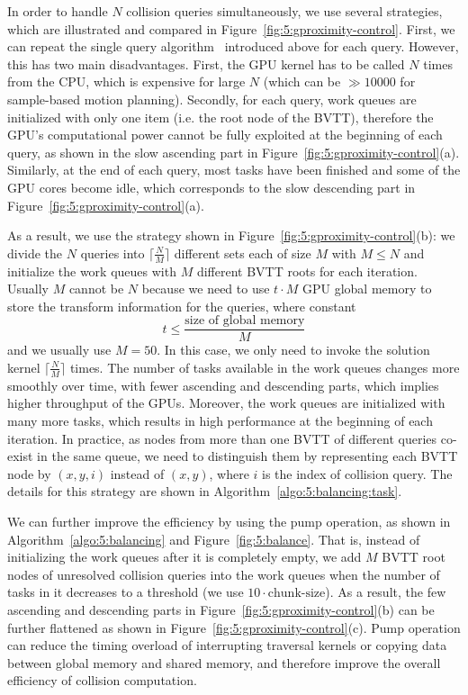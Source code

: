In order to handle $N$ collision queries simultaneously, we use several strategies, which are illustrated and compared in Figure~\ref{fig:5:gproximity-control}. First, we can repeat the single query algorithm~\cite{Lauterbach10} introduced above for each query. However, this has two main disadvantages. First, the GPU kernel has to be called $N$ times from the CPU, which is expensive for large $N$ (which can be $\gg 10000$ for sample-based motion planning). Secondly, for each query, work queues are initialized with only one item (i.e. the root node of the BVTT), therefore the GPU's computational power cannot be fully exploited at the beginning of each query, as shown in the slow ascending part in Figure~\ref{fig:5:gproximity-control}(a). Similarly, at the end of each query, most tasks have been finished and some of the GPU cores become idle, which corresponds to the slow descending part in Figure~\ref{fig:5:gproximity-control}(a).

As a result, we use the strategy shown in Figure~\ref{fig:5:gproximity-control}(b): we divide the $N$ queries into $\lceil\frac{N}{M}\rceil$ different sets each of size $M$ with $M\leq N$ and initialize the work queues with $M$ different BVTT roots for each iteration. Usually $M$ cannot be $N$ because we need to use $t \cdot M$ GPU global memory to store the transform information for the queries, where constant $$t \leq \frac{\text{size of global memory}}{M}$$ and we usually use $M=50$. In this case, we only need to invoke the solution kernel $\lceil\frac{N}{M}\rceil$ times. The number of tasks available in the work queues changes more smoothly over time, with fewer ascending and descending parts, which implies higher
throughput of the GPUs. Moreover, the work queues are initialized with many more tasks, which results in high performance at the beginning of each iteration. In practice, as nodes from more than one BVTT of different queries co-exist in the same queue, we need to distinguish them by representing each BVTT node by $(x,y,i)$ instead of $(x,y)$, where $i$ is the index of collision query. The details for this strategy are shown in Algorithm~\ref{algo:5:balancing:task}.

We can further improve the efficiency by using the pump operation, as shown in Algorithm~\ref{algo:5:balancing} and Figure~\ref{fig:5:balance}. That is, instead of initializing the work queues after it is completely empty, we add $M$ BVTT root nodes of unresolved collision queries into the work queues when the number of tasks in it decreases to a threshold (we use $10\cdot \text{chunk-size}$). As a result, the few ascending and descending parts in Figure~\ref{fig:5:gproximity-control}(b) can be further flattened as shown in Figure~\ref{fig:5:gproximity-control}(c). Pump operation can reduce the timing overload of interrupting traversal kernels or copying data between global memory and shared memory, and therefore improve the overall efficiency of collision computation.


